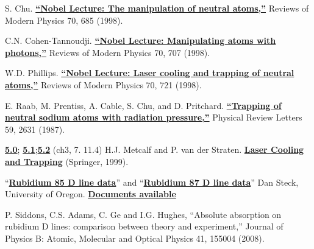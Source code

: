 \documentclass{../lab}
\begin{document}
\begin{thebibliography}{}
\label{sec:References}
     S. Chu. \href{http://physics111.lib.berkeley.edu/Physics111/Reprints/MOT/Steven\_Chu-Neutral\_Particles.pdf}{\textbf{``Nobel Lecture: The manipulation of neutral atoms,''}} Reviews of Modern Physics 70, 685 (1998).

     C.N. Cohen-Tannoudji. \href{http://physics111.lib.berkeley.edu/Physics111/Reprints/MOT/Cohen-Tannoudji\_RMP\_70-707.pdf}{\textbf{``Nobel Lecture: Manipulating atoms with photons,''}} Reviews of Modern Physics 70, 707 (1998).

     W.D. Phillips. \href{http://physics111.lib.berkeley.edu/Physics111/Reprints/MOT/W.Philips_RMP_70-3-1998_p721_1.pdf}{\textbf{``Nobel Lecture: Laser cooling and trapping of neutral atoms,''}} Reviews of Modern Physics 70, 721 (1998).

     E. Raab, M. Prentiss, A. Cable, S. Chu, and D. Pritchard. \href{http://physics111.lib.berkeley.edu/Physics111/Reprints/MOT/Raab_Prentiss_Chu_PRL_v59-23-1987.pdf}{\textbf{``Trapping of neutral sodium atoms with radiation pressure,''}} Physical Review Letters 59, 2631 (1987).

     \href{http://physics111.lib.berkeley.edu/Physics111/Reprints/MOT/Laser\_Cooling\_and\_Trapping\_HJ\_Metcalf/MOT\%20OCR\%20ch.\%203\%20force\%20on\%20two-level\%20atoms.pdf}{\textbf{5.0}}; \href{http://physics111.lib.berkeley.edu/Physics111/Reprints/MOT/Laser\_Cooling\_and\_Trapping\_HJ\_Metcalf/MOT\%20OCR\%20ch.\%207\%20optical\%20molasses.pdf}{\textbf{5.1}};\href{http://physics111.lib.berkeley.edu/Physics111/Reprints/MOT/Laser\_Cooling\_and\_Trapping\_HJ\_Metcalf/MOT\%20OCR\%20\%20ch.\%2011.4\%20magneto-optical\%20traps.pdf}{\textbf{5.2}} (ch3, 7. 11.4) H.J. Metcalf and P. van der Straten. \href{http://physics111.lib.berkeley.edu/Physics111/Reprints/MOT/Laser\_Cooling\_and\_Trapping\_HJ\_Metcalf/}{\textbf{Laser Cooling and Trapping}} (Springer, 1999).

     ``\href{http://physics111.lib.berkeley.edu/Physics111/Reprints/MOT/rubidium85numbers.pdf}{\textbf{Rubidium 85 D line data}}'' and ``\href{http://physics111.lib.berkeley.edu/Physics111/Reprints/MOT/rubidium87numbers.pdf}{\textbf{Rubidium 87 D line data}}'' Dan Steck, University of Oregon. \href{http://steck.us/alkalidata/}{\textbf{Documents available}}

     P. Siddons, C.S. Adams, C. Ge and I.G. Hughes, ``Absolute absorption on rubidium D lines: comparison between theory and experiment,'' Journal of Physics B: Atomic, Molecular and Optical Physics 41, 155004 (2008).


\end{thebibliography}
\end{document}
